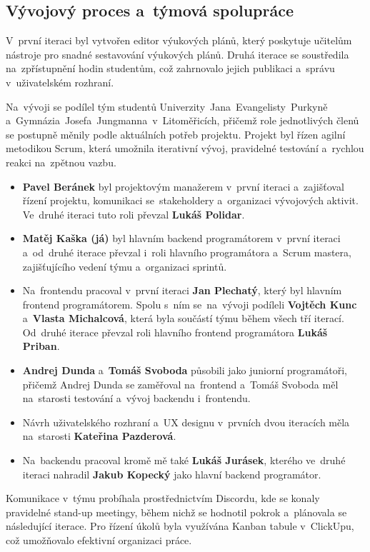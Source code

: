 \documentclass[male,czech,api_bc]{kitheses}
\begin{document}
\subsection{Vývojový proces a~týmová spolupráce}

V~první iteraci byl vytvořen editor výukových plánů, který poskytuje učitelům nástroje pro snadné sestavování výukových plánů. Druhá iterace se soustředila na~zpřístupnění hodin studentům, což zahrnovalo jejich publikaci a~správu v~uživatelském rozhraní.

Na~vývoji se podílel tým studentů Univerzity~Jana~Evangelisty~Purkyně a~Gymnázia~Josefa~Jungmanna~v~Litoměřicích, přičemž role jednotlivých členů se postupně měnily podle aktuálních potřeb projektu. Projekt byl řízen agilní metodikou Scrum, která umožnila iterativní vývoj, pravidelné testování a~rychlou reakci na~zpětnou vazbu.

\begin{itemize}
	\item \textbf{Pavel Beránek} byl projektovým manažerem v~první iteraci a~zajišťoval řízení projektu, komunikaci se~stakeholdery a~organizaci vývojových aktivit. Ve~druhé iteraci tuto roli převzal \textbf{Lukáš Polidar}.
	\item \textbf{Matěj Kaška (já)} byl hlavním backend programátorem v~první iteraci a~od~druhé iterace převzal i~roli hlavního programátora a~Scrum mastera, zajišťujícího vedení týmu a~organizaci sprintů.
	\item Na~frontendu pracoval v~první iteraci \textbf{Jan Plechatý}, který byl hlavním frontend programátorem. Spolu s~ním se~na~vývoji podíleli \textbf{Vojtěch Kunc} a~\textbf{Vlasta Michalcová}, která byla součástí týmu během všech tří iterací. Od~druhé iterace převzal roli hlavního frontend programátora \textbf{Lukáš Priban}.
	\item \textbf{Andrej Dunda} a~\textbf{Tomáš Svoboda} působili jako juniorní programátoři, přičemž Andrej Dunda se zaměřoval na~frontend a~Tomáš Svoboda měl na~starosti testování a~vývoj backendu i~frontendu.
	\item Návrh uživatelského rozhraní a~UX designu v~prvních dvou iteracích měla na~starosti \textbf{Kateřina Pazderová}.
	\item Na~backendu pracoval kromě mě také \textbf{Lukáš Jurásek}, kterého ve~druhé iteraci nahradil \textbf{Jakub Kopecký} jako hlavní backend programátor.
\end{itemize}

Komunikace v~týmu probíhala prostřednictvím Discordu, kde se konaly pravidelné stand-up meetingy, během nichž se hodnotil pokrok a~plánovala se následující iterace. Pro řízení úkolů byla využívána Kanban tabule v~ClickUpu, což umožňovalo efektivní organizaci práce.
\end{document}
